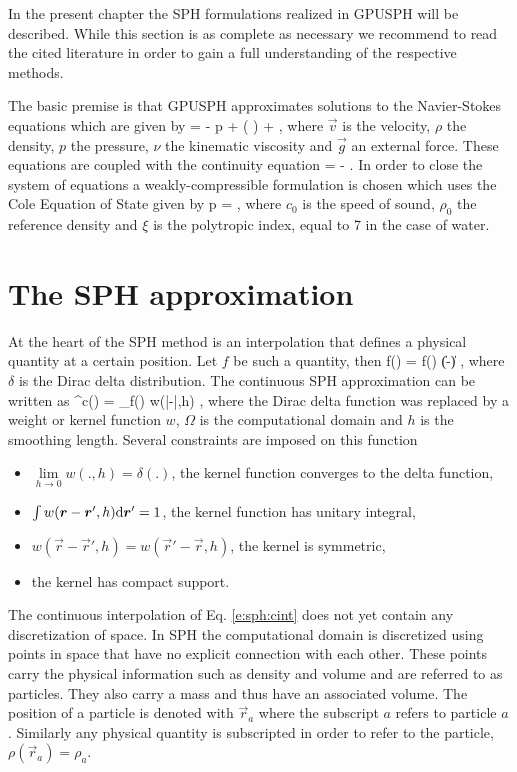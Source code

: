 In the present chapter the SPH formulations realized in GPUSPH will be
described. While this section is as complete as necessary we recommend
to read the cited literature in order to gain a full understanding of
the respective methods.

The basic premise is that GPUSPH approximates solutions to the
Navier-Stokes equations which are given by
\be
{} = -\vec{\nabla} p + \nabla \cdot (\nu
\vec{\nabla} \otimes {}) + ,
\label{e:sph:ns}
\en
where $\vec{v}$ is the velocity, $\rho$ the density, $p$ the
pressure, $\nu$ the kinematic viscosity and $\vec{g}$ an external
force. These equations are coupled with the continuity equation
\be
{} = - \rho \nabla \cdot {}.
\label{e:sph:cont}
\en
In order to close the system of equations a weakly-compressible
formulation is chosen which uses the Cole Equation of State given by
\be
p = ,
\label{e:sph:eos}
\en
where $c_0$ is the speed of sound, $\rho_0$ the reference density and
$\xi$ is the polytropic index, equal to 7 in the case of water.

\section{The SPH approximation}

At the heart of the SPH method is an interpolation that defines a
physical quantity at a certain position. Let $f$ be such a quantity,
then
\be
f() = \int f() \delta(\|-\|) \td {},
\label{e:sph:delta}
\en
where $\delta$ is the Dirac delta distribution. The continuous SPH
approximation can be written as
\be
[f]^c() = \int_\Omega f() w(|-|,h) \td {},
\label{e:sph:cint}
\en
where the Dirac delta function was replaced by a weight or kernel
function $w$, $\Omega$ is the computational domain and $h$ is the
smoothing length. Several constraints are imposed on this function
\begin{itemize}
\item $\underset{h\rightarrow 0}{\lim} w(.,h) = \delta(.)$, \ie the
kernel function converges to the delta function,
\item $\int w(\bm{r}-\bm{r}',h) \text{d} \bm{r}' = 1$, \ie the kernel function has unitary
integral,
\item $w(\vec{r}-\vec{r}',h) = w(\vec{r}'-\vec{r},h)$, \ie the kernel is symmetric,
\item the kernel has compact support.
\end{itemize}
The continuous interpolation of Eq. \eqref{e:sph:cint} does not yet
contain any discretization of space. In SPH the computational domain is
discretized using points in space that have no explicit connection with
each other. These points carry the physical information such as density
and volume and are referred to as particles. They also carry a mass and
thus have an associated volume. The position of a particle is denoted
with $\vec{r}_a$ where the subscript $a$ refers to particle $a$.
Similarly any physical quantity is subscripted in order to refer to the
particle, \eg $\rho(\vec{r}_a) = \rho_a$.

